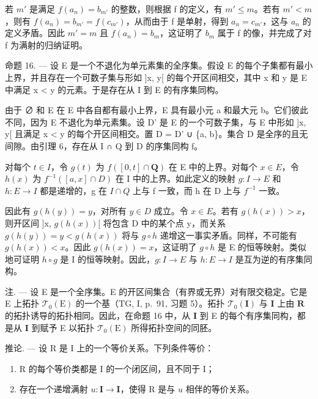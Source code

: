 若 \(m'\) 是满足 \(f(a_n) = b_{m'}\) 的整数，则根据 f 的定义，有 \(m' \leqslant m\)。若有 \(m' < m\)，则有 \(f(a_n) = b_{m'} = f(c_{m'})\)，从而由于 f 是单射，得到 \(a_n = c_{m'}\)，这与 \(a_n\) 的定义矛盾。因此 \(m' = m\) 且 \(f(a_n) = b_m\)，这证明了 \(b_m\) 属于 f 的像，并完成了对 f 为满射的归纳证明。

命题 16. --- 设 E 是一个不退化为单元素集的全序集。假设 E 的每个子集都有最小上界，并且存在一个可数子集与形如 {]}x, y{[} 的每个开区间相交，其中 x 和 y 是 E 中满足 x \textless{} y 的元素。于是存在从 I 到 E 的有序集同构。

由于 ∅ 和 E 在 E 中各自都有最小上界，E 具有最小元 a 和最大元 b。它们彼此不同，因为 E 不退化为单元素集。设 D' 是 E 的一个可数子集，与 E 中形如 {]}x, y{[} 且满足 x \textless{} y 的每个开区间相交。置 D = D' ∪ \{a, b\}。集合 D 是全序的且无间隙。由引理 6，存在从 I ∩ Q 到 D 的序集同构 f。

对每个 \(t \in I\)，令 \(g(t)\) 为 \(f([0, t] \cap \mathbf{Q})\) 在 E 中的上界。对每个 \(x \in E\)，令 \(h(x)\) 为 \(f^{-1}([a, x] \cap D)\) 在 I 中的上界。如此定义的映射 \(g: I \to E\) 和 \(h: E \to I\) 都是递增的，g 在 \(I \cap Q\) 上与 f 一致，而 h 在 D 上与 \(f^{-1}\) 一致。

因此有 \(g(h(y)) = y\)，对所有 \(y \in D\) 成立。令 \(x \in E\)。若有 \(g(h(x)) > x\)，则开区间 {]}x, \(g(h(x))[\) 将包含 D 中的某个点 y，而关系 \(g(h(y)) = y < g(h(x))\) 将与 \(g \circ h\) 递增这一事实矛盾。同样，不可能有 \(g(h(x)) < x\)。因此 \(g(h(x)) = x\)，这证明了 \(g \circ h\) 是 E 的恒等映射。类似地可证明 \(h \circ g\) 是 I 的恒等映射。因此，\(g: I \to E\) 与 \(h: E \to I\) 是互为逆的有序集同构。

注. --- 设 E 是一个全序集。E 的开区间集合（有界或无界）对有限交稳定。它是 E 上拓扑 \(\mathcal{T}_{0}(\mathrm{E})\) 的一个基（TG, I, p.~91, 习题 5）。拓扑 \(\mathcal{T}_{0}(\mathbf{I})\) 与 \(\mathbf{I}\) 上由 \(\mathbf{R}\) 的拓扑诱导的拓扑相同。因此，在命题 16 中，从 \(\mathbf{I}\) 到 E 的每个有序集同构，都是从 \(\mathbf{I}\) 到赋予 E 以拓扑 \(\mathcal{T}_{0}(\mathrm{E})\) 所得拓扑空间的同胚。

推论. --- 设 R 是 I 上的一个等价关系。下列条件等价：

\begin{enumerate}
\def\labelenumi{(\roman{enumi})}
\item
  R 的每个等价类都是 I 的一个闭区间，且不同于 I；
\item
  存在一个递增满射 \(u\colon\mathbf{I}\to\mathbf{I}\)，使得 R 是与 \(u\) 相伴的等价关系。
\end{enumerate}


